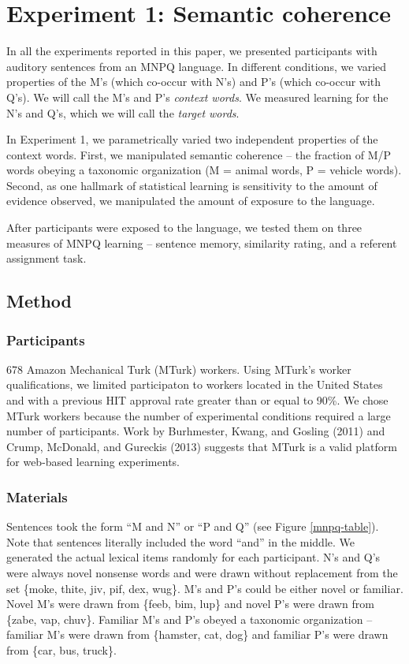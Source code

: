 \documentclass[man,floatsintext]{apa6}
\begin{document}
\section{Experiment 1: Semantic coherence}

In all the experiments reported in this paper, we presented participants with auditory sentences from an MNPQ language. In different conditions, we varied properties of the M's (which co-occur with N's) and P's (which co-occur with Q's). We will call the M's and P's \emph{context words}. We measured learning for the N's and Q's, which we will call the \emph{target words}.

In Experiment 1, we parametrically varied two independent properties of the context words. First, we manipulated semantic coherence -- the fraction of M/P words obeying a taxonomic organization (M = animal words, P = vehicle words). Second, as one hallmark of statistical learning is sensitivity to the amount of evidence observed, we manipulated the amount of exposure to the language.

After participants were exposed to the language, we tested them on three measures of MNPQ learning -- sentence memory, similarity rating, and a referent assignment task.

\subsection{Method}

\subsubsection{Participants}
678 Amazon Mechanical Turk (MTurk) workers. Using MTurk's worker qualifications, we limited participaton to workers located in the United States and with a previous HIT approval rate greater than or equal to 90\%. We chose MTurk workers because the number of experimental conditions required a large number of participants. Work by Burhmester, Kwang, and Gosling (2011) and Crump, McDonald, and Gureckis (2013) suggests that MTurk is a valid platform for web-based learning experiments.

\subsubsection{Materials}
Sentences took the form ``M and N'' or ``P and Q'' (see Figure \ref{mnpq-table}). Note that sentences literally included the word ``and'' in the middle. We generated the actual lexical items randomly for each participant. N's and Q's were always novel nonsense words and were drawn without replacement from the set \{moke, thite, jiv, pif, dex, wug\}. M's and P's could be either novel or familiar. Novel M's were drawn from \{feeb, bim, lup\} and novel P's were drawn from \{zabe, vap, chuv\}. Familiar M's and P's obeyed a taxonomic organization -- familiar M's were drawn from \{hamster, cat, dog\} and familiar P's were drawn from \{car, bus, truck\}.
\end{document}
